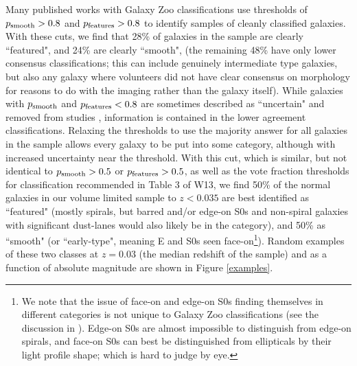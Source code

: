 \documentclass[usenatbib]{mn2e}
\begin{document}
 Many published works with Galaxy Zoo classifications use thresholds of $p_{\rm smooth}>0.8$ and $p_{\rm features}>0.8$ to identify samples of cleanly classified galaxies. With these cuts, we find that {28\%} of galaxies in the sample are clearly ``featured", and {24\%} are clearly ``smooth", (the remaining 48\% have only lower consensus classifications; this can include genuinely intermediate type galaxies, but also any galaxy where volunteers did not have clear consensus on morphology for reasons to do with the imaging rather than the galaxy itself). While galaxies with $p_{\rm smooth}$ and $p_{\rm features}<0.8$ are sometimes described as ``uncertain" and removed from studies \citep[e.g.][]{Schawinski2014}, information is contained in the lower agreement classifications. Relaxing the thresholds to use the majority answer for all galaxies in the sample allows every galaxy to be put into some category, although with increased uncertainty near the threshold. With this cut, which is similar, but not identical to  $p_{\rm smooth}>0.5$ or $p_{\rm features}>0.5$, as well as the vote fraction thresholds for classification recommended in Table 3 of W13, we find {50\%} of the normal galaxies in our volume limited sample to $z<0.035$ are best identified as ``featured" (mostly spirals, but barred and/or edge-on S0s and non-spiral galaxies with significant dust-lanes would also likely be in the category), and {50\%} as ``smooth" (or ``early-type", meaning E and S0s seen face-on\footnote{We note that the issue of face-on and edge-on S0s finding themselves in different categories is not unique to Galaxy Zoo classifications (see the discussion in \citealt{Bamford2009}). Edge-on S0s are almost impossible to distinguish from edge-on spirals, and face-on S0s can best be distinguished from ellipticals by their light profile shape; which is hard to judge by eye.}). Random examples of these two classes at $z=0.03$ (the median redshift of the sample) and as a function of absolute magnitude are shown in Figure \ref{examples}. %
 
\end{document}

